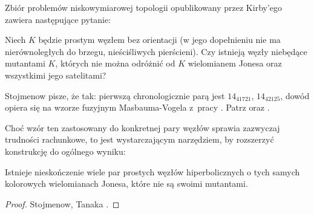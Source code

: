 Zbiór problemów niskowymiarowej topologii opublikowany przez Kirby'ego \cite{kirby1978} zawiera następujące pytanie:
%

\begin{conjecture}[problem 1.91]
    Niech $K$ będzie prostym węzłem bez orientacji (w jego dopełnieniu nie ma nierównoległych do brzegu, nieściśliwych pierścieni).
    Czy istnieją węzły niebędące mutantami $K$, których nie można odróżnić od $K$ wielomianem Jonesa oraz wszystkimi jego satelitami?
\end{conjecture}

Stojmenow pisze, że tak: pierwszą chronologicznie parą jest $14_{41721}$, $14_{42125}$, dowód opiera się na wzorze fuzyjnym Masbauma-Vogela z~pracy \cite{masbaum1994}.
%
%
%
Patrz \cite[przykład 3.3]{tanaka2009} oraz \cite[przykład 3.2]{stoimenow2010}.

Choć wzór ten zastosowany do konkretnej pary węzłów sprawia zazwyczaj trudności rachunkowe, to jest wystarczającym narzędziem, by rozszerzyć konstrukcję do ogólnego wyniku:

\begin{proposition}
    Istnieje nieskończenie wiele par prostych węzłów hiperbolicznych o tych samych kolorowych wielomianach Jonesa, które nie są swoimi mutantami.
\end{proposition}

\begin{proof}
    Stojmenow, Tanaka \cite[tw. 1.1]{tanaka2009}.
\end{proof}


